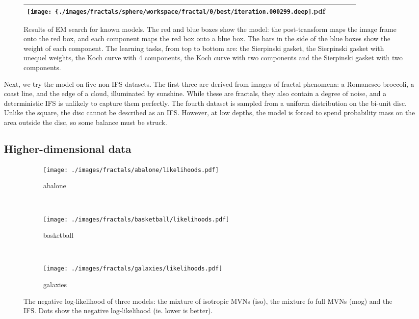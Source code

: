 \begin{figure}
\begin{tabular}{c c c c c}
    \texttt{[image: \{./images/fractals/sphere/workspace/fractal/0/best/iteration.000299.deep]}.pdf} \\
\hline 
\end{tabular}  
  \caption{Results of EM search for known models. The red and blue boxes show the model: the post-transform maps the image frame onto the red box, and each component maps the red box onto a blue box. The bars in the side of the blue boxes show the weight of each component. The learning tasks, from top to bottom are: the Sierpinski gasket, the Sierpinski gasket with unequel weights, the Koch curve with 4 components, the Koch curve with two components and the Sierpinski gasket with two components.}
  \label{figure:non-ifs}
\end{figure}

Next, we try the model on five non-IFS datasets. The first three are derived from images of fractal phenomena: a Romanesco broccoli, a coast line, and the edge of a cloud, illuminated by sunshine. While these are fractals, they also contain a degree of noise, and a deterministic IFS is unlikely to capture them perfectly. The fourth dataset is sampled from a uniform distribution on the bi-unit disc. Unlike the square, the disc cannot be described as an IFS. However, at low depths, the model is forced to spend probability mass on the area outside the disc, so some balance must be struck. 

\subsection{Higher-dimensional data}

\begin{figure}[htb]
  \centering
  \begin{subfigure}[b]{0.3\textwidth}
  	\texttt{[image: ./images/fractals/abalone/likelihoods.pdf]}
  	\caption{abalone}
  \end{subfigure}
  ~
  \begin{subfigure}[b]{0.3\textwidth}
  	\texttt{[image: ./images/fractals/basketball/likelihoods.pdf]}
  	\caption{basketball}
  \end{subfigure}
  ~
  \begin{subfigure}[b]{0.3\textwidth}
  	\texttt{[image: ./images/fractals/galaxies/likelihoods.pdf]}
  	\caption{galaxies}
  \end{subfigure}
  \caption{The negative log-likelihood of three models: the mixture of isotropic MVNs (iso), the mixture fo full MVNs (mog) and the IFS. Dots show the negative log-likelihood (ie. lower is better).}
  \label{figure:ifs-high}
\end{figure}

